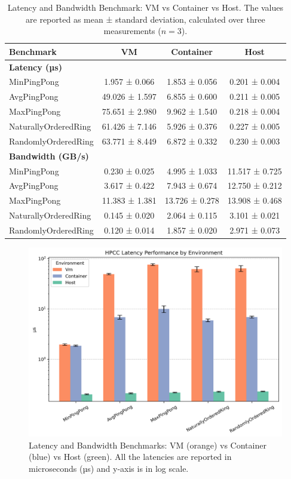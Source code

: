 \begin{table}[htbp]
\centering
\renewcommand{\arraystretch}{1.2}
\begin{tabular}{lccc}
\toprule
\textbf{Benchmark} & \textbf{VM} & \textbf{Container} & \textbf{Host} \\
\midrule
\multicolumn{4}{l}{\textbf{Latency (µs)}} \\
MinPingPong             & 1.957 ± 0.066 & 1.853 ± 0.056 & 0.201 ± 0.004 \\
AvgPingPong              & 49.026 ± 1.597 & 6.855 ± 0.600 & 0.211 ± 0.005 \\
MaxPingPong              & 75.651 ± 2.980 & 9.962 ± 1.540 & 0.218 ± 0.004 \\
NaturallyOrderedRing    & 61.426 ± 7.146 & 5.926 ± 0.376 & 0.227 ± 0.005 \\
RandomlyOrderedRing     & 63.771 ± 8.449 & 6.872 ± 0.332 & 0.230 ± 0.003 \\
\midrule
\multicolumn{4}{l}{\textbf{Bandwidth (GB/s)}} \\
MinPingPong            & 0.230 ± 0.025 & 4.995 ± 1.033 & 11.517 ± 0.725 \\
AvgPingPong            & 3.617 ± 0.422 & 7.943 ± 0.674 & 12.750 ± 0.212 \\
MaxPingPong            & 11.383 ± 1.381 & 13.726 ± 0.278 & 13.908 ± 0.468 \\
NaturallyOrderedRing  & 0.145 ± 0.020 & 2.064 ± 0.115 & 3.101 ± 0.021 \\
RandomlyOrderedRing   & 0.120 ± 0.014 & 1.857 ± 0.020 & 2.971 ± 0.073 \\
\bottomrule
\end{tabular}
\caption{Latency and Bandwidth Benchmark: VM vs Container vs Host. The values are reported as mean ± standard deviation, calculated over three measurements ($n = 3$).}
\label{tab:pingpong}
\end{table}

\begin{figure}[htbp]
    \centering
    \includegraphics[width=0.8\linewidth]{assets/hpcc_latency_performance.png}
    \caption{Latency and Bandwidth Benchmarks: VM (orange) vs Container (blue) vs Host (green). All the latencies are reported in microseconds (µs) and y-axis is in log scale.}
    \label{fig:hpcc_latency_performance}
\end{figure}

